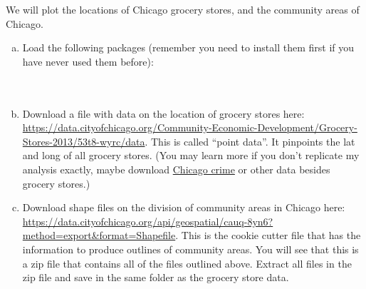 \documentclass{beamer}
\begin{document}
\begin{frame}[allowframebreaks]
	\begin{myexc}
	\fontsize{9pt}{11}\selectfont
	We will plot the locations of Chicago grocery stores, and the community areas of Chicago.
		\begin{enumerate}[(a)]
			\item
			Load the following packages (remember you need to install them first if you have never used them before):\\
			\\
            \\
            \item
            Download a  file with data on the location of grocery stores here: \scriptsize\url{https://data.cityofchicago.org/Community-Economic-Development/Grocery-Stores-2013/53t8-wyrc/data}\footnotesize. This is called ``point data''. It pinpoints the lat and long of all grocery stores. (You may learn more if you don't replicate my analysis exactly, maybe download \href{https://data.cityofchicago.org/Public-Safety/Crimes-2001-to-present-Dashboard/5cd6-ry5g}{Chicago crime} or other data besides grocery stores.)
            \item
            Download shape files on the division of community areas in Chicago here: \scriptsize\url{https://data.cityofchicago.org/api/geospatial/cauq-8yn6?method=export&format=Shapefile}\footnotesize. This is the cookie cutter file that has the information to produce outlines of community areas. You will see that this is a zip file that contains all of the files outlined above. Extract all files in the zip file and save in the same folder as the grocery store data.
		\end{enumerate}
	\end{myexc}
	

\end{frame}
\end{document}
